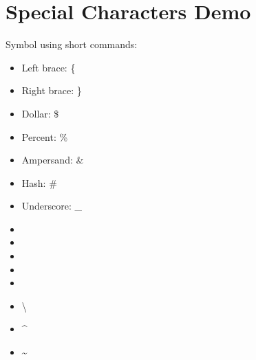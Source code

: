 \documentclass{article}
\begin{document}
\section{Special Characters Demo}

Symbol using short commands:

\begin{itemize}
    \item Left brace: \{
    \item Right brace: \}
    \item Dollar: \$
    \item Percent: \%
    \item Ampersand: \&
    \item Hash: \#
    \item Underscore: \_
\end{itemize}

\begin{itemize}
    \item \textbraceleft
    \item \textbraceright
    \item \textdollar
    \item \textunderscore
    \item \textunderscore
    \item \textbackslash
    \item \textasciicircum
    \item \textasciitilde
\end{itemize}
\end{document}
